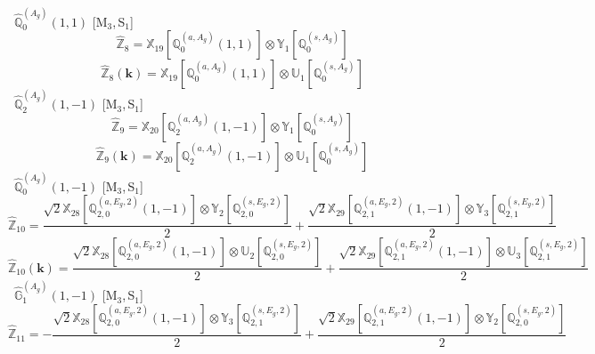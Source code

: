 \documentclass[fleqn,10pt,landscape]{article}
\begin{document}
\begin{itemize}
\begin{dmath*}
\end{dmath*}
\vspace{4mm}
\noindent {} $\,\,\,\hat{\mathbb{Q}}_{0}^{(A_{g})}(1,1)$ [M$_{3}$,\,S$_{1}$]
\begin{dmath*}
\hat{\mathbb{Z}}_{8}=\mathbb{X}_{19}[\mathbb{Q}_{0}^{(a,A_{g})}(1,1)] \otimes\mathbb{Y}_{1}[\mathbb{Q}_{0}^{(s,A_{g})}]
\end{dmath*}
\begin{dmath*}
\hat{\mathbb{Z}}_{8}(\bm{k})=\mathbb{X}_{19}[\mathbb{Q}_{0}^{(a,A_{g})}(1,1)] \otimes\mathbb{U}_{1}[\mathbb{Q}_{0}^{(s,A_{g})}]
\end{dmath*}
\vspace{4mm}
\noindent {} $\,\,\,\hat{\mathbb{Q}}_{2}^{(A_{g})}(1,-1)$ [M$_{3}$,\,S$_{1}$]
\begin{dmath*}
\hat{\mathbb{Z}}_{9}=\mathbb{X}_{20}[\mathbb{Q}_{2}^{(a,A_{g})}(1,-1)] \otimes\mathbb{Y}_{1}[\mathbb{Q}_{0}^{(s,A_{g})}]
\end{dmath*}
\begin{dmath*}
\hat{\mathbb{Z}}_{9}(\bm{k})=\mathbb{X}_{20}[\mathbb{Q}_{2}^{(a,A_{g})}(1,-1)] \otimes\mathbb{U}_{1}[\mathbb{Q}_{0}^{(s,A_{g})}]
\end{dmath*}
\vspace{4mm}
\noindent {} $\,\,\,\hat{\mathbb{Q}}_{0}^{(A_{g})}(1,-1)$ [M$_{3}$,\,S$_{1}$]
\begin{dmath*}
\hat{\mathbb{Z}}_{10}=\frac{\sqrt{2} \mathbb{X}_{28}[\mathbb{Q}_{2,0}^{(a,E_{g},2)}(1,-1)] \otimes\mathbb{Y}_{2}[\mathbb{Q}_{2,0}^{(s,E_{g},2)}]}{2} + \frac{\sqrt{2} \mathbb{X}_{29}[\mathbb{Q}_{2,1}^{(a,E_{g},2)}(1,-1)] \otimes\mathbb{Y}_{3}[\mathbb{Q}_{2,1}^{(s,E_{g},2)}]}{2}
\end{dmath*}
\begin{dmath*}
\hat{\mathbb{Z}}_{10}(\bm{k})=\frac{\sqrt{2} \mathbb{X}_{28}[\mathbb{Q}_{2,0}^{(a,E_{g},2)}(1,-1)] \otimes\mathbb{U}_{2}[\mathbb{Q}_{2,0}^{(s,E_{g},2)}]}{2} + \frac{\sqrt{2} \mathbb{X}_{29}[\mathbb{Q}_{2,1}^{(a,E_{g},2)}(1,-1)] \otimes\mathbb{U}_{3}[\mathbb{Q}_{2,1}^{(s,E_{g},2)}]}{2}
\end{dmath*}
\vspace{4mm}
\noindent {} $\,\,\,\hat{\mathbb{G}}_{1}^{(A_{g})}(1,-1)$ [M$_{3}$,\,S$_{1}$]
\begin{dmath*}
\hat{\mathbb{Z}}_{11}=- \frac{\sqrt{2} \mathbb{X}_{28}[\mathbb{Q}_{2,0}^{(a,E_{g},2)}(1,-1)] \otimes\mathbb{Y}_{3}[\mathbb{Q}_{2,1}^{(s,E_{g},2)}]}{2} + \frac{\sqrt{2} \mathbb{X}_{29}[\mathbb{Q}_{2,1}^{(a,E_{g},2)}(1,-1)] \otimes\mathbb{Y}_{2}[\mathbb{Q}_{2,0}^{(s,E_{g},2)}]}{2}

\end{dmath*}
\end{itemize}
\end{document}
